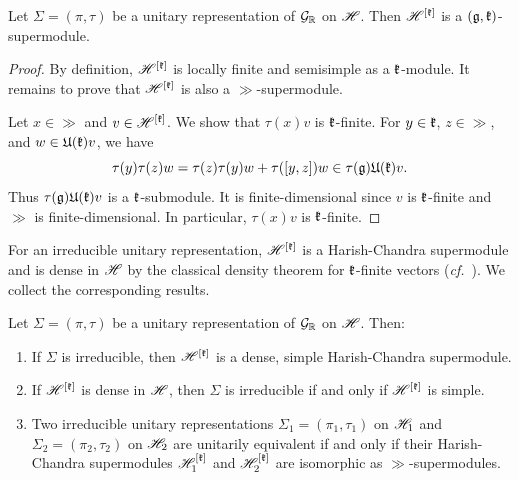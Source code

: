 \begin{lemma}
Let $\Sigma=(\pi,\tau)$ be a unitary representation of ${\mathcal{G}}_{{\mathbb R}}$ on ${\mathscr{H}}$. Then ${\mathscr{H}}^{[{\mathfrak k}]}$ is a $({\mathfrak{g}},{\mathfrak k})$-supermodule.
\end{lemma}

\begin{proof} By definition, ${\mathscr{H}}^{[{\mathfrak k}]}$ is locally finite and semisimple as a ${\mathfrak k}$-module. It remains to prove that ${\mathscr{H}}^{[{\mathfrak k}]}$ is also a $\gg$-supermodule. 

Let $x\in\gg$ and $v\in{\mathscr{H}}^{[{\mathfrak k}]}$. We show that $\tau(x)v$ is ${\mathfrak k}$-finite. For $y\in{\mathfrak k}$, $z\in\gg$, and $w\in{\mathfrak U}({\mathfrak k})v$, we have
\[
\tau(y)\tau(z)w=\tau(z)\tau(y)w+\tau([y,z])w\in\tau({\mathfrak{g}}){\mathfrak U}({\mathfrak k})v.
\]
Thus $\tau({\mathfrak{g}}){\mathfrak U}({\mathfrak k})v$ is a ${\mathfrak k}$-submodule. It is finite-dimensional since $v$ is ${\mathfrak k}$-finite and $\gg$ is finite-dimensional. In particular, $\tau(x)v$ is ${\mathfrak k}$-finite.
\end{proof}

For an irreducible unitary representation, ${\mathscr{H}}^{[{\mathfrak k}]}$ is a Harish-Chandra supermodule and is dense in ${\mathscr{H}}$ by the classical density theorem for ${\mathfrak k}$-finite vectors (\emph{cf.}~\cite{Alldridge}). We collect the corresponding results.

\begin{proposition}
Let $\Sigma=(\pi,\tau)$ be a unitary representation of ${\mathcal{G}}_{{\mathbb R}}$ on ${\mathscr{H}}$. Then:
\begin{enumerate}
    \item[(a)] If $\Sigma$ is irreducible, then ${\mathscr{H}}^{[{\mathfrak k}]}$ is a dense, simple Harish-Chandra supermodule.

    \item[(b)] If ${\mathscr{H}}^{[{\mathfrak k}]}$ is dense in ${\mathscr{H}}$, then $\Sigma$ is irreducible if and only if ${\mathscr{H}}^{[{\mathfrak k}]}$ is simple.

    \item[(c)] Two irreducible unitary representations
    $\Sigma_1=(\pi_1,\tau_1)$ on ${\mathscr{H}}_1$ and
    $\Sigma_2=(\pi_2,\tau_2)$ on ${\mathscr{H}}_2$
    are unitarily equivalent if and only if their Harish-Chandra supermodules ${\mathscr{H}}_1^{[{\mathfrak k}]}$ and ${\mathscr{H}}_2^{[{\mathfrak k}]}$ are isomorphic as $\gg$-supermodules.
\end{enumerate}
\end{proposition}


